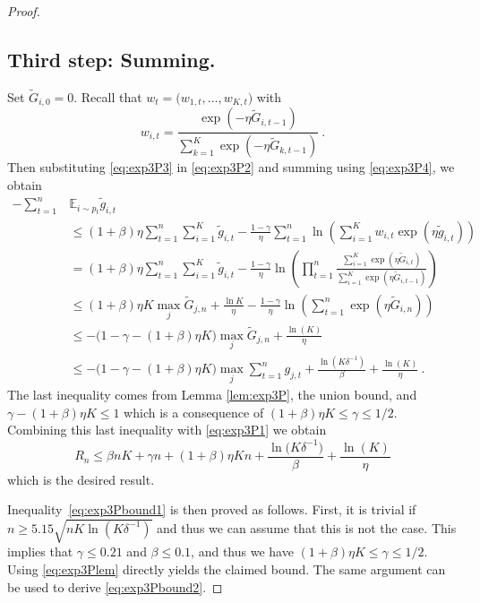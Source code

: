 \documentclass[11pt]{hackednow}
\newcommand{\E}{\mathbb{E}}
\renewcommand{\tilde}{\widetilde}
\begin{document}
\begin{proof}
\subsection*{Third step: Summing.}
%
Set $\tilde{G}_{i,0} = 0$. Recall that $w_t=\bigl(w_{1,t},\hdots,w_{K,t}\bigr)$ with 
\begin{equation} \label{eq:exp3P4}
w_{i,t} = \frac{\exp{\left(- \eta \tilde{G}_{i,t-1}\right)}}{\sum_{k=1}^K \exp{\left(- \eta \tilde{G}_{k,t-1}\right)}}~.
\end{equation}
Then substituting \eqref{eq:exp3P3} in \eqref{eq:exp3P2} and summing using \eqref{eq:exp3P4}, we obtain
%
\begin{align*}
- \sum_{t=1}^n &\E_{i \sim p_t} \tilde{g}_{i,t} \\
& \leq (1+\beta) \eta \sum_{t=1}^n \sum_{i=1}^K \tilde{g}_{i,t} - \frac{1-\gamma}{\eta} \sum_{t=1}^n \ln \left( \sum_{i=1}^K w_{i,t} \exp{\left( \eta \tilde{g}_{i,t} \right)}  \right) \\
& = (1+\beta) \eta \sum_{t=1}^n \sum_{i=1}^K \tilde{g}_{i,t} - \frac{1-\gamma}{\eta} \ln \left( \prod_{t=1}^n \frac{\sum_{i=1}^K \exp(\eta \tilde{G}_{i,t})}{\sum_{i=1}^K \exp(\eta \tilde{G}_{i,t-1})} \right) \\
& \leq (1+\beta) \eta K \max_j \tilde{G}_{j,n} + \frac{\ln K}{\eta} - \frac{1-\gamma}{\eta} \ln \left( \sum_{t=1}^n \exp(\eta \tilde{G}_{i,n}) \right) \\
& \leq - \bigl(1 - \gamma - (1+\beta) \eta K\bigr) \max_j \tilde{G}_{j,n} + \frac{\ln(K)}{\eta} \\
& \leq - \bigl(1 - \gamma - (1+\beta) \eta K\bigr) \max_j \sum_{t=1}^n g_{j,t} + \frac{\ln(K \delta^{-1})}{\beta} + \frac{\ln(K)}{\eta}~.
\end{align*}
The last inequality comes from Lemma \ref{lem:exp3P}, the union bound, and $\gamma - (1+\beta) \eta K \leq 1$ which is a consequence of $(1+\beta) \eta K \leq \gamma \leq 1/2$. Combining this last inequality with \eqref{eq:exp3P1} we obtain
$$R_n \leq \beta n K + \gamma n + (1+\beta) \eta K n + \frac{\ln\bigl(K \delta^{-1}\bigr)}{\beta} + \frac{\ln(K)}{\eta}$$
which is the desired result.

Inequality~\eqref{eq:exp3Pbound1} is then proved as follows. First, it is trivial if $n \geq 5.15 \sqrt{n K \ln(K \delta^{-1})}$ and thus we can assume that this is not the case. This implies that $\gamma \leq 0.21$ and $\beta \leq 0.1$, and thus we have $(1+\beta) \eta K \leq \gamma \leq 1/2$. Using \eqref{eq:exp3Plem} directly yields the claimed bound. The same argument can be used to derive \eqref{eq:exp3Pbound2}.
\end{proof}
\end{document}
